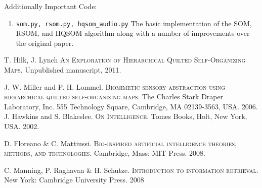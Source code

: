 \documentclass[12pt,a4paper]{article}
\begin{document}
Additionally Important Code:
\begin{enumerate}
\item \texttt{som.py, rsom.py, hqsom\_audio.py} The basic implementation of the SOM, RSOM, and HQSOM algorithm along with a number of improvements over the original paper. 
\end{enumerate}

\newpage
\begin{thebibliography}{}

 T. Hilk, J. Lynch \textsc{An Exploration of Hierarchical Quilted
Self-Organizing Maps}. Unpublished manuscript, 2011.

 J. W. Miller and P. H. Lommel. \textsc{Biomimetic sensory abstraction using
hierarchical quilted self-organizing maps}. The Charles Stark Draper Laboratory, Inc. 555 Technology
Square, Cambridge, MA 02139-3563, USA. 2006.
 J. Hawkins and S. Blakeslee. \textsc{On Intelligence}. Tomes Books, Holt,
New York, USA. 2002.

 D. Floreano \& C. Mattiussi. \textsc{Bio-inspired artificial intelligence theories, methods, and technologies}. Cambridge, Mass: MIT Press. 2008.

 C. Manning, P. Raghavan \& H. Schutze. \textsc{Introduction to information retrieval}. New York: Cambridge University Press. 2008
\end{thebibliography}
\newpage
\end{document}
